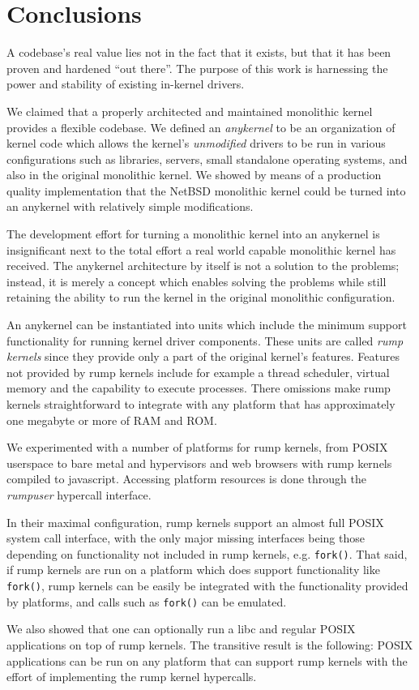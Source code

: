 
\section{Conclusions}
\label{chap:conclusions}

A codebase's real value lies not in the fact that it exists, but that
it has been proven and hardened ``out there''.  The purpose of this work
is harnessing the power and stability of existing in-kernel drivers.

We claimed that a properly architected and maintained monolithic kernel
provides a flexible codebase.  We defined an \textit{anykernel} to be an
organization of kernel code which allows the kernel's \textit{unmodified}
drivers to be run in various configurations such as libraries, servers,
small standalone operating systems, and also in the original monolithic
kernel.  We showed by means of a production quality implementation that
the NetBSD monolithic kernel could be turned into an anykernel with
relatively simple modifications.

The development effort for turning a monolithic kernel into an anykernel
is insignificant next to the total effort a real world capable monolithic
kernel has received.  The anykernel architecture by itself is not a
solution to the problems; instead, it is merely a concept which enables
solving the problems while still retaining the ability to run the kernel
in the original monolithic configuration.

An anykernel can be instantiated into units which include the minimum
support functionality for running kernel driver components.  These units
are called \textit{rump kernels} since they provide only a part of
the original kernel's features.  Features not provided by rump kernels
include for example a thread scheduler, virtual memory and the capability
to execute processes.  There omissions make rump kernels straightforward
to integrate with any platform that has approximately one megabyte or
more of RAM and ROM.

We experimented with a number of platforms for rump kernels, from POSIX
userspace to bare metal and hypervisors and web browsers with rump
kernels compiled to javascript.  Accessing platform resources is done
through the \textit{rumpuser} hypercall interface.

In their maximal configuration, rump kernels support an almost full
POSIX system call interface, with the only major missing interfaces
being those depending on functionality not included in rump kernels,
e.g. \texttt{fork()}.  That said, if rump kernels are run on a platform
which does support functionality like \texttt{fork()}, rump kernels can
be easily be integrated with the functionality provided by platforms,
and calls such as \texttt{fork()} can be emulated.

We also showed that one can optionally run a libc and regular POSIX
applications on top of rump kernels.  The transitive result is the
following: POSIX applications can be run on any platform that can support
rump kernels with the effort of implementing the rump kernel hypercalls.
